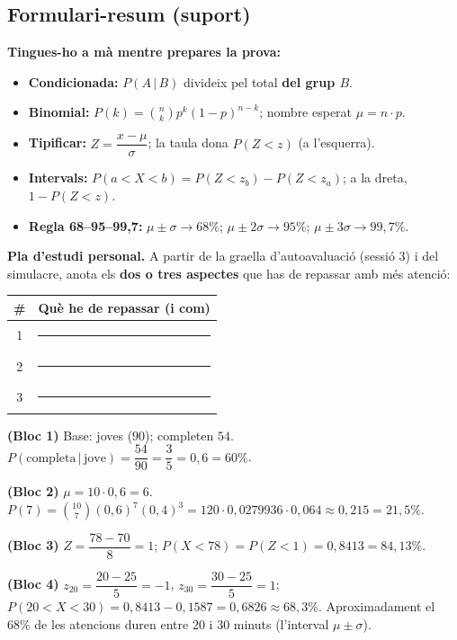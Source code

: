 \subsection{Formulari-resum (suport)}

\begin{idea}
\textbf{Tingues-ho a mà mentre prepares la prova:}
\begin{itemize}[leftmargin=1.4em, itemsep=2pt]
  \item \textbf{Condicionada:} $P(A\,|\,B)$ divideix pel total \textbf{del grup $B$}.
  \item \textbf{Binomial:} $P(k)=\binom{n}{k}p^{k}(1-p)^{n-k}$; nombre esperat
        $\mu=n\cdot p$.
  \item \textbf{Tipificar:} $Z=\dfrac{x-\mu}{\sigma}$; la taula dona $P(Z<z)$ (a
        l'esquerra).
  \item \textbf{Intervals:} $P(a<X<b)=P(Z<z_b)-P(Z<z_a)$; a la dreta, $1-P(Z<z)$.
  \item \textbf{Regla 68--95--99,7:} $\mu\pm\sigma\to 68\%$; $\mu\pm2\sigma\to 95\%$;
        $\mu\pm3\sigma\to 99,7\%$.
\end{itemize}
\end{idea}

\noindent\textbf{Pla d'estudi personal.} A partir de la graella d'autoavaluació (sessió 3)
i del simulacre, anota els \textbf{dos o tres aspectes} que has de repassar amb més
atenció:
\begin{center}
\renewcommand{\arraystretch}{1.5}
\begin{tabular}{c p{10.5cm}}
\toprule
\textbf{\#} & \textbf{Què he de repassar (i com)} \\
\midrule
1 & \rule{9.8cm}{0.4pt} \\
2 & \rule{9.8cm}{0.4pt} \\
3 & \rule{9.8cm}{0.4pt} \\
\bottomrule
\end{tabular}
\end{center}

\begin{solucions}
\begin{sollist}
  \item \textbf{(Bloc 1)} Base: joves ($90$); completen $54$.
        $P(\text{completa}\,|\,\text{jove})=\dfrac{54}{90}=\dfrac{3}{5}=0,6=60\%$.
  \item \textbf{(Bloc 2)} $\mu=10\cdot 0,6=6$. $P(7)=\binom{10}{7}(0,6)^7(0,4)^3=
        120\cdot 0,0279936\cdot 0,064\approx 0,215=21,5\%$.
  \item \textbf{(Bloc 3)} $Z=\dfrac{78-70}{8}=1$; $P(X<78)=P(Z<1)=0,8413=84,13\%$.
  \item \textbf{(Bloc 4)} $z_{20}=\dfrac{20-25}{5}=-1$, $z_{30}=\dfrac{30-25}{5}=1$;
        $P(20<X<30)=0,8413-0,1587=0,6826\approx 68,3\%$. Aproximadament el $68\%$ de les
        atencions duren entre $20$ i $30$ minuts (l'interval $\mu\pm\sigma$).
\end{sollist}
\end{solucions}
